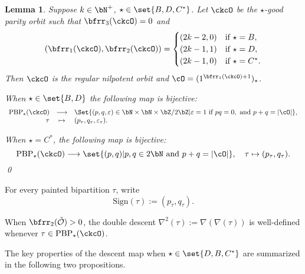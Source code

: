 \documentclass[12pt,a4paper]{amsart}
\def\abs#1{\left|{#1}\right|}
\newcommand{\CO}{{\mathcal {O}}}
\def\DD{\nabla}
\numberwithin{equation}{section}
\newtheorem{lem}[thm]{Lemma}
\theoremstyle{remark}
\def\ssign{\mathrm{Sign}}
\def\PBP{\mathrm{PBP}}
\begin{document}
\begin{lem}
\label{lem:D.sign}
  Suppose $k\in \bN^{+}$, $\star\in \set{B,D,C^{*}}$. Let $\ckcO$ be the
    $\star$-good parity orbit such that   $\bfrr_{3}(\ckcO)=0$ and
    \[
      (\bfrr_{1}(\ckcO), \bfrr_{2}(\ckcO))
      =
      \begin{cases}
        (2k-2,0) & \text{if } \star=B,\\
        (2k-1,1) & \text{if } \star=D,\\
        (2k-1,0) & \text{if } \star=C^{*}.\\
      \end{cases}
    \]
    Then $\ckcO$ is the regular nilpotent orbit %
    and $\cO = (1^{\bfrr_{1}(\ckcO)+1})_{\star}$.

When $\star\in \set{B,D}$ the following map is bijective:
\[
  \begin{array}{rcl}
    \PBP_{\star}(\ckcO)& \longrightarrow& \Set{
    (p,q,\varepsilon) \in \bN\times\bN\times \bZ/2\bZ|
    \varepsilon=1 \text{ if } pq=0,\text{ and } p+q=\abs{\cO}
    },\\
    \tau &  \mapsto & (p_{\tau},q_{\tau}, \varepsilon_{\tau}).
  \end{array}
\]

When $\star = C^{*}$, the following map is bijective:
\[
  \PBP_{\star}(\ckcO) \longrightarrow \set{(p,q)|p,q \in 2\bN \text{ and }
    p+q=\abs{\cO} }, \quad \tau \mapsto (p_{\tau},q_{\tau}).
\]
\qed
\end{lem}



For every painted bipartition $\tau$, write
\[
  \ssign(\tau):=(p_\tau, q_\tau).
\]

When $\bfrr_2(\check \CO)>0$, the double descent
$\DD^2(\tau):=\DD(\DD(\tau))$ is well-defined whenever
$\tau\in \PBP_{\star}(\ckcO)$.


The key properties of the descent map when $\star\in \set{D,B,C^*}$ are summarized in the following two propositions.
\end{document}
